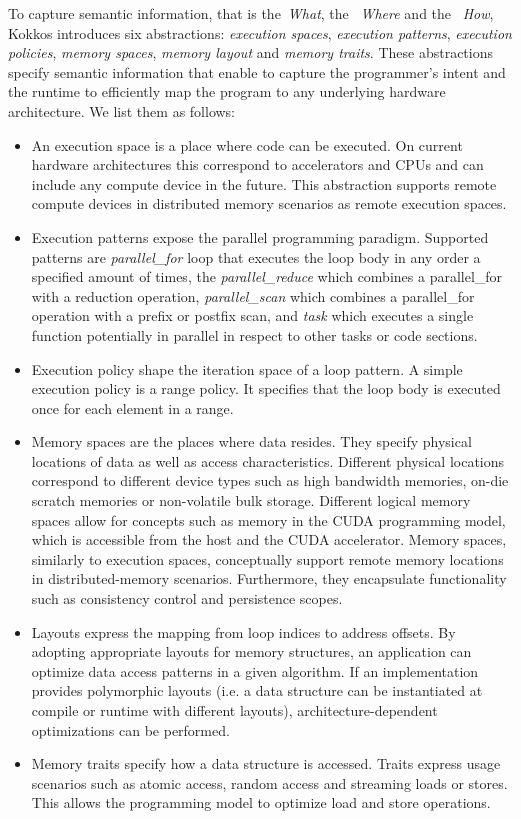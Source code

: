 To capture semantic information, that is the~\emph{What}, the ~\emph{Where} and the ~\emph{How}, Kokkos introduces six abstractions: \emph{execution spaces}, \emph{execution patterns}, \emph{execution policies}, \emph{memory spaces}, \emph{memory layout} and \emph{memory traits}. These abstractions specify semantic information that enable to capture the programmer's intent and the runtime to efficiently map the program to any underlying hardware architecture. We list them as follows:
\begin{itemize}
	\item  An execution space is a place where code can be executed. On current hardware architectures this correspond to accelerators and CPUs and can include any compute device in the future. This abstraction supports remote compute devices in distributed memory scenarios as remote execution spaces.
	\item Execution patterns expose the parallel programming paradigm. Supported patterns are \emph{parallel\_for} loop that executes the loop body in any order a specified amount of times, the \emph{parallel\_reduce} which combines a parallel\_for with a reduction operation, \emph{parallel\_scan} which combines a parallel\_for operation with a prefix or postfix scan, and \emph{task} which executes a single function potentially in parallel in respect to other tasks or code sections. 
	\item Execution policy shape the iteration space of a loop pattern. A simple execution policy is a range policy. It specifies that the loop body is executed once for each element in a range.
	\item Memory spaces are the places where data resides. They specify physical locations of data as well as access characteristics. Different physical locations correspond to different device types such as high bandwidth memories, on-die scratch memories or non-volatile bulk storage. Different logical memory spaces allow for concepts such as memory in the CUDA programming model, which is accessible from the host and the CUDA accelerator. Memory spaces, similarly to execution spaces, conceptually support remote memory locations in distributed-memory scenarios. Furthermore, they encapsulate functionality such as consistency control and persistence scopes.
	\item Layouts express the mapping from loop indices to address offsets. By adopting appropriate layouts for memory structures, an application can optimize data access patterns in a given algorithm. If an implementation provides polymorphic layouts (i.e. a data structure can be instantiated at compile or runtime with different layouts), architecture-dependent optimizations can be performed.
	\item Memory traits specify how a data structure is accessed. Traits express usage scenarios such as atomic access, random access and streaming loads or stores. This allows the programming model to  optimize load and store operations.
\end{itemize}


